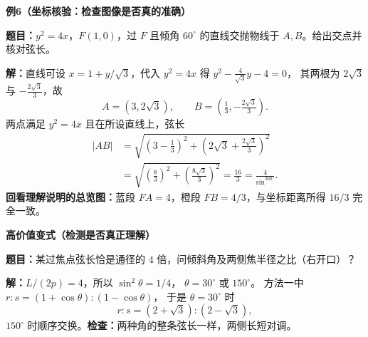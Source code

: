 \begin{examplebox}
\textbf{\textcolor{CExample}{例6（坐标核验：检查图像是否真的准确）}}\par
\textbf{题目：}$y^2=4x$，$F(1,0)$，过 $F$ 且倾角 $60^\circ$ 的直线交抛物线于 $A,B$。给出交点并核对弦长。\par
\textbf{解：}直线可设 $x=1+y/\sqrt3$，代入 $y^2=4x$ 得
$y^2-\frac4{\sqrt3}y-4=0$，
其两根为 $2\sqrt3$ 与 $-\frac{2\sqrt3}{3}$，故
\[
A=(3,2\sqrt3),\qquad B=(\tfrac13,-\tfrac{2\sqrt3}{3}).
\]
两点满足 $y^2=4x$ 且在所设直线上，弦长
\[
\begin{aligned}
|AB|&=\sqrt{(3-\tfrac13)^2+(2\sqrt3+\tfrac{2\sqrt3}3)^2}\\
&=\sqrt{(\tfrac83)^2+(\tfrac{8\sqrt3}3)^2}=\boxed{\tfrac{16}3}
=\frac4{\sin^260^\circ}.
\end{aligned}
\]
\textbf{回看理解说明的总览图：}蓝段 $FA=4$，橙段 $FB=4/3$，与坐标距离所得 $16/3$ 完全一致。\par\medskip
\textbf{\textcolor{CExample}{高价值变式（检测是否真正理解）}}\par
\textbf{题目：}某过焦点弦长恰是通径的 $4$ 倍，问倾斜角及两侧焦半径之比（右开口）？\par
\textbf{解：}$L/(2p)=4$，所以 $\sin^2\theta=1/4$，
$\theta=30^\circ$ 或 $150^\circ$。
方法一中 $r:s=(1+\cos\theta):(1-\cos\theta)$，
于是 $\theta=30^\circ$ 时
\[
\boxed{r:s=(2+\sqrt3):(2-\sqrt3)},
\]
$150^\circ$ 时顺序交换。\textbf{检查：}两种角的整条弦长一样，两侧长短对调。
\end{examplebox}
